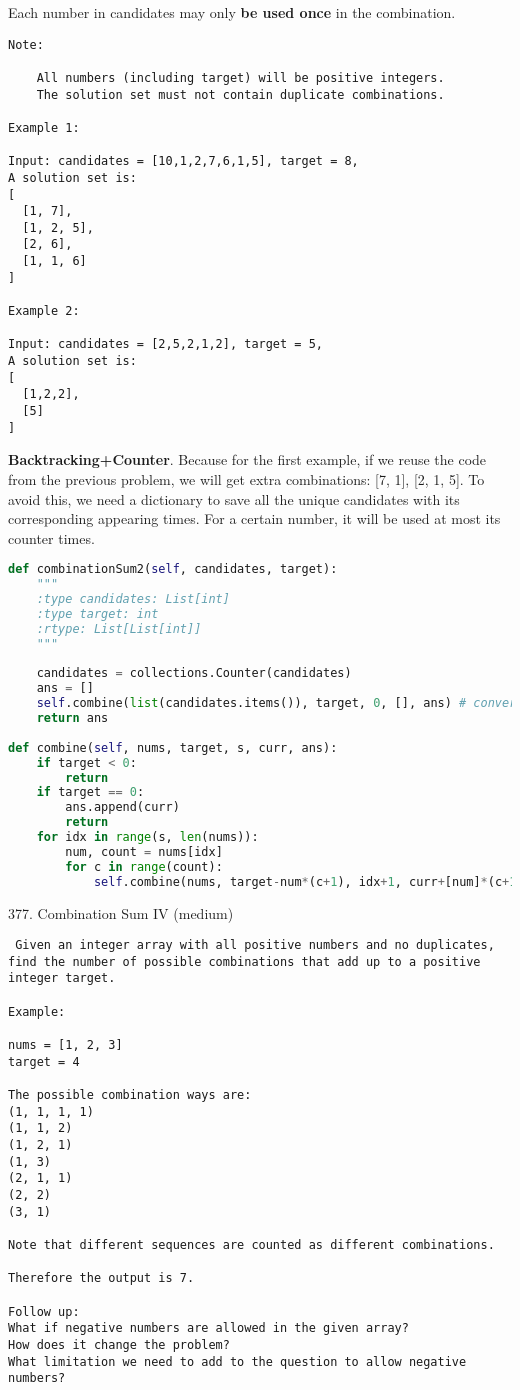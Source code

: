 \documentclass[../../question_3_array_question.tex]{subfiles}
\begin{document}
Each number in candidates may only \textbf{be used once} in the combination.
\begin{lstlisting}
Note:

    All numbers (including target) will be positive integers.
    The solution set must not contain duplicate combinations.

Example 1:

Input: candidates = [10,1,2,7,6,1,5], target = 8,
A solution set is:
[
  [1, 7],
  [1, 2, 5],
  [2, 6],
  [1, 1, 6]
]

Example 2:

Input: candidates = [2,5,2,1,2], target = 5,
A solution set is:
[
  [1,2,2],
  [5]
]
\end{lstlisting}
\textbf{Backtracking+Counter}. Because for the first example, if we reuse the code from the previous problem, we will get extra combinations: [7, 1], [2, 1, 5]. To avoid this, we need a dictionary to save all the unique candidates with its corresponding appearing times. For a certain number, it will be used at most its counter times. 
\begin{lstlisting}[language=Python]
def combinationSum2(self, candidates, target):
    """
    :type candidates: List[int]
    :type target: int
    :rtype: List[List[int]]
    """
        
    candidates = collections.Counter(candidates)
    ans = []
    self.combine(list(candidates.items()), target, 0, [], ans) # convert the Counter to a list of (key, item) tuple
    return ans
    
def combine(self, nums, target, s, curr, ans):
    if target < 0:
        return 
    if target == 0:
        ans.append(curr)
        return
    for idx in range(s, len(nums)):           
        num, count = nums[idx]
        for c in range(count):
            self.combine(nums, target-num*(c+1), idx+1, curr+[num]*(c+1), ans )
\end{lstlisting}
377. Combination Sum IV (medium)
\begin{lstlisting}
 Given an integer array with all positive numbers and no duplicates, find the number of possible combinations that add up to a positive integer target.

Example:

nums = [1, 2, 3]
target = 4

The possible combination ways are:
(1, 1, 1, 1)
(1, 1, 2)
(1, 2, 1)
(1, 3)
(2, 1, 1)
(2, 2)
(3, 1)

Note that different sequences are counted as different combinations.

Therefore the output is 7.

Follow up:
What if negative numbers are allowed in the given array?
How does it change the problem?
What limitation we need to add to the question to allow negative numbers? 
\end{lstlisting}
\end{document}
